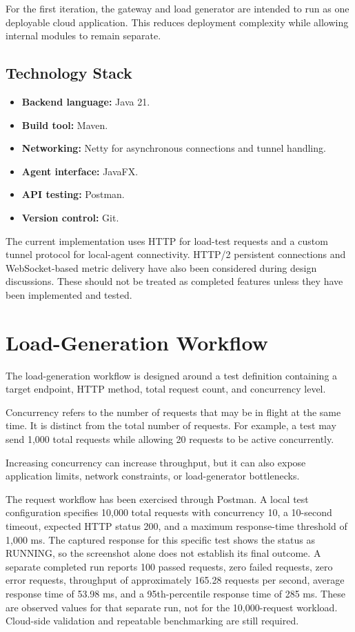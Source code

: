 \documentclass[11pt,a4paper,oneside]{report}
\begin{document}
For the first iteration, the gateway and load generator are
intended to run as one deployable cloud application. This
reduces deployment complexity while allowing internal modules
to remain separate.

\subsection{Technology Stack}

\begin{itemize}
  \item \textbf{Backend language:} Java 21.
  \item \textbf{Build tool:} Maven.
  \item \textbf{Networking:} Netty for asynchronous connections
  and tunnel handling.
  \item \textbf{Agent interface:} JavaFX.
  \item \textbf{API testing:} Postman.
  \item \textbf{Version control:} Git.
\end{itemize}

The current implementation uses HTTP for load-test requests
and a custom tunnel protocol for local-agent connectivity.
HTTP/2 persistent connections and WebSocket-based metric
delivery have also been considered during design discussions.
These should not be treated as completed features unless
they have been implemented and tested.

\section{Load-Generation Workflow}

The load-generation workflow is designed around a test
definition containing a target endpoint, HTTP method, total
request count, and concurrency level.

Concurrency refers to the number of requests that may be
in flight at the same time. It is distinct from the total
number of requests. For example, a test may send 1,000 total
requests while allowing 20 requests to be active concurrently.

Increasing concurrency can increase throughput, but it can
also expose application limits, network constraints, or
load-generator bottlenecks.

The request workflow has been exercised through Postman. A local
test configuration specifies 10,000 total requests with concurrency
10, a 10-second timeout, expected HTTP status 200, and a maximum
response-time threshold of 1,000 ms. The captured response for this
specific test shows the status as RUNNING, so the screenshot alone
does not establish its final outcome. A separate completed run
reports 100 passed requests, zero failed requests, zero error
requests, throughput of approximately 165.28 requests per second,
average response time of 53.98 ms, and a 95th-percentile response
time of 285 ms. These are observed values for that separate run,
not for the 10,000-request workload. Cloud-side validation and
repeatable benchmarking are still required.
\end{document}
